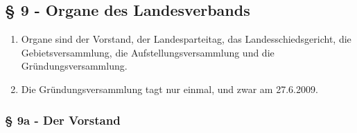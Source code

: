\documentclass[draft,a4paper,10pt]{article}
\begin{document}
\subsection{§ 9 - Organe des Landesverbands}
\begin{enumerate}
\item Organe sind der Vorstand, der Landesparteitag, das Landesschiedsgericht,
die Gebietsversammlung, die Aufstellungsversammlung und die
Gründungsversammlung.

\item Die Gründungsversammlung tagt nur einmal, und zwar am 27.6.2009. 
\end{enumerate}

\subsubsection{§ 9a - Der Vorstand}
\end{document}
